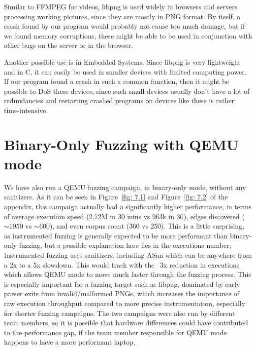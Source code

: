 \documentclass[letterpaper,twocolumn,10pt]{article}
\begin{document}
Similar to FFMPEG for videos, libpng is used widely in browsers and servers processing working pictures, since they are mostly in PNG format. By itself, a crash found by our program would probably not cause too much damage, but if we found memory corruptions, these might be able to be used in conjunction with other bugs on the server or in the browser.

Another possible use is in Embedded Systems. Since libpng is very lightweight and in C, it can easily be used in smaller devices with limited computing power. If our program found a crash in such a common function, then it might be possible to DoS these devices, since such small devices usually don't have a lot of redundancies and restarting crashed programs on devices like these is rather time-intensive. 

\section{Binary-Only Fuzzing with QEMU mode}

We have also run a QEMU fuzzing campaign, in binary-only mode, without any sanitizers. As it can be seen in Figure~\ref{fig: 7.1} and Figure~\ref{fig: 7.2} of the appendix, this campaign actually had a significantly higher performance, in terms of average execution speed (2.72M in 30 mins vs 963k in 30), edges discovered ($\sim 1950$ vs $\sim 600$), and even corpus count (360 vs 250). This is a little surprising, as instrumented fuzzing is generally expected to be more performant than binary-only fuzzing, but a possible explanation here lies in the executions number; Instrumented fuzzing uses sanitizers, including ASan which can be anywhere from a 2x to a 5x slowdown. This would track with the ~3x reduction in executions which allows QEMU mode to move much faster through the fuzzing process. This is especially important for a fuzzing target such as libpng, dominated by early parser exits from invalid/malformed PNGs, which increases the importance of raw execution throughput compared to more precise instrumentation, especially for shorter fuzzing campaigns. The two campaigns were also run by different team members, so it is possible that hardware differences could have contributed to the performance gap, if the team member responsible for QEMU mode happens to have a more performant laptop.

\end{document}
